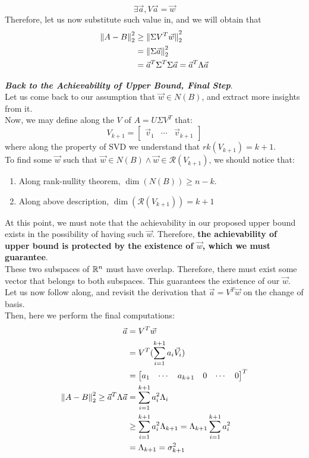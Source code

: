 \[
    \exists \vec{a}, V \vec{a} = \vec{w}
\]
Therefore, let us now substitute such value in, and we will obtain that
\begin{align*}
    \pnorm[2]{A - B}{2}
    &\geq \pnorm[2]{\Sigma V^T \vec{w}}{2} \\
    &= \pnorm[2]{\Sigma \vec{a}}{2} \\
    &= \vec{a}^T \Sigma^T \Sigma \vec{a} = \vec{a}^T \Lambda \vec{a}
\end{align*}
\par
\textbf{\textit{Back to the Achievability of Upper Bound, Final Step}}. \\
Let us come back to our assumption that $\vec{w} \in N(B)$, and extract more insights from it. \\
Now, we may define along the $V$ of $A = U \Sigma V^T$ that:
\[
    V_{k + 1} = \begin{bmatrix} \vec{v}_1 & \cdots & \vec{v}_{k + 1}\end{bmatrix}
\]
where along the property of SVD we understand that $rk(V_{k + 1}) = k + 1$. \\
To find some $\vec{w}$ such that $\vec{w} \in N(B) \land \vec{w} \in \mathcal{R}(V_{k + 1})$, we should notice that:
\begin{enumerate}
    \item Along rank-nullity theorem, $\dim(N(B)) \geq n - k$.
    \item Along above description, $\dim(\mathcal{R} (V_{k + 1})) = k + 1$
\end{enumerate}
At this point, we must note that the achievability in our proposed upper bound exists in the possibility of having such $\vec{w}$. Therefore, \textbf{the achievability of upper bound is protected by the existence of $\vec{w}$, which we must guarantee}. \\
These two subspaces of $\R^n$ must have overlap. Therefore, there must exist some vector that belongs to both subspaces. This guarantees the existence of our $\vec{w}$. \\
Let us now follow along, and revisit the derivation that $\vec{a} = V^T \vec{w}$ on the change of basis. \\
Then, here we perform the final computations:
\begin{align*}
    \vec{a} &= V^T \vec{w} \\
    &= V^T (\sum_{i = 1}^{k + 1} a_i \vec{V}_i) \\
    &= \begin{bmatrix} a_1 & \cdots & a_{k + 1} & 0 & \cdots & 0 \end{bmatrix}^T \\
    \pnorm[2]{A - B}{2} \geq \vec{a}^T \Lambda \vec{a}
    &= \sum_{i = 1}^{k + 1} a_{i}^2 \Lambda_i \\
    &\geq \sum_{i = 1}^{k + 1} a_{i}^2 \Lambda_{k + 1} = \Lambda_{k + 1} \sum_{i = 1}^{k + 1} a_{i}^2 \\
    &= \Lambda_{k + 1} = \sigma_{k + 1}^2
\end{align*}
